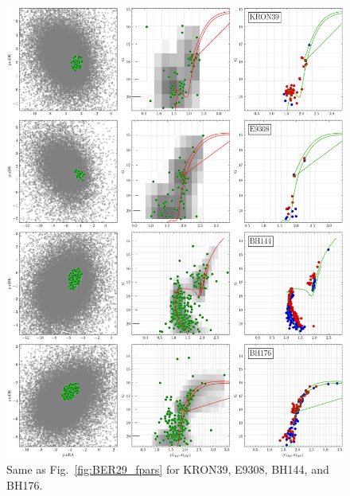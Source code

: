 \documentclass[draft]{aa}
\begin{document}
\begin{appendix}
 \begin{figure}
  \centering
  \includegraphics[height=.95\textheight]{figs/16_fpars.png}
  \caption{Same as Fig.~\ref{fig:BER29_fpars} for KRON39, E9308, BH144, and BH176.}
  \label{fig:16fpars}
 \end{figure}


\end{appendix}
\end{document}

